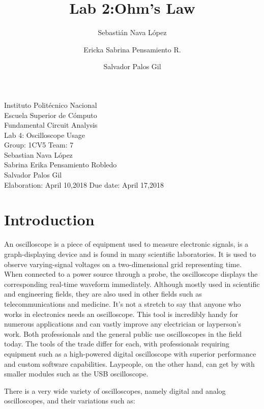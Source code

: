 \documentclass[letterpaper]{article}
\title{Lab 2:Ohm's Law}
\author{
    Sebastián Nava López\\
    \and
    Ericka Sabrina Pensamiento R.\\
    \and
    Salvador Palos Gil
}
\begin{document}
\begin{titlepage}
    \centering
    {\Huge Instituto Politécnico Nacional}\\[3ex]
    {\huge Escuela Superior de Cómputo}\\[8ex]
    {\huge Fundamental Circuit Analysis}\\[12ex]
    {\Large Lab 4: Oscilloscope Usage}\\[20ex]
    {\Large Group: 1CV5 Team: 7 \\[8ex]
    Sebastian Nava López\\[4ex]
    Sabrina Erika Pensamiento Robledo\\[4ex]
    Salvador Palos Gil\\[18ex]
    }
    \large{Elaboration: April 10,2018\hspace{8em} Due date: April 17,2018}
\end{titlepage}
\tableofcontents
\newpage
\section{Introduction}
An oscilloscope is a piece of equipment used to measure electronic signals, is a graph-displaying device and is found in many scientific laboratories. It is used to observe varying-signal voltages on a two-dimensional grid representing time. When connected to a power source through a probe, the oscilloscope displays the corresponding real-time waveform immediately. Although mostly used in scientific and engineering fields, they are also used in other fields such as telecommunications and medicine. It’s not a stretch to say that anyone who works in electronics needs an oscilloscope. This tool is incredibly handy for numerous applications and can vastly improve any electrician or layperson’s work. Both professionals and the general public use oscilloscopes in the field today. The tools of the trade differ for each, with professionals requiring equipment such as a high-powered digital oscilloscope with superior performance and custom software capabilities. Laypeople, on the other hand, can get by with smaller modules such as the USB oscilloscope.

There is a very wide variety of oscilloscopes, namely digital and analog oscilloscopes, and their variations such as:
\end{document}
